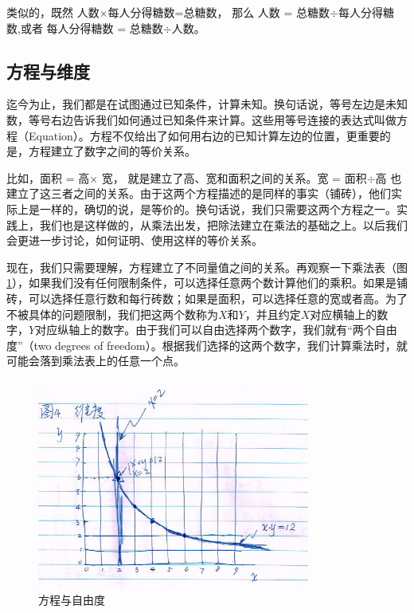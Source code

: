 类似的，既然
人数$\times$每人分得糖数=总糖数，
那么 
人数 = 总糖数$\div$每人分得糖数,或者 每人分得糖数 = 总糖数$\div$人数。

\subsection{方程与维度}

迄今为止，我们都是在试图通过已知条件，计算未知。换句话说，等号左边是未知数，等号右边告诉我们如何通过已知条件来计算。这些用等号连接的表达式叫做方程（Equation）。方程不仅给出了如何用右边的已知计算左边的位置，更重要的是，方程建立了数字之间的等价关系。

比如，面积 = 高$\times$ 宽， 就是建立了高、宽和面积之间的关系。宽 = 面积$\div$高 也建立了这三者之间的关系。由于这两个方程描述的是同样的事实（铺砖），他们实际上是一样的，确切的说，是等价的。换句话说，我们只需要这两个方程之一。实践上，我们也是这样做的，从乘法出发，把除法建立在乘法的基础之上。以后我们会更进一步讨论，如何证明、使用这样的等价关系。

现在，我们只需要理解，方程建立了不同量值之间的关系。再观察一下乘法表（图\ref{img_dof}），如果我们没有任何限制条件，可以选择任意两个数计算他们的乘积。如果是铺砖，可以选择任意行数和每行砖数；如果是面积，可以选择任意的宽或者高。为了不被具体的问题限制，我们把这两个数称为$X$和$Y$，并且约定$X$对应横轴上的数字，$Y$对应纵轴上的数字。由于我们可以自由选择两个数字，我们就有“两个自由度”（two degrees of freedom）。根据我们选择的这两个数字，我们计算乘法时，就可能会落到乘法表上的任意一个点。

\begin{figure}[h]
     \center
     \includegraphics[width=0.8\textwidth]{division_res/dof}
     \caption{方程与自由度}
     \label{img_dof}
\end{figure}

